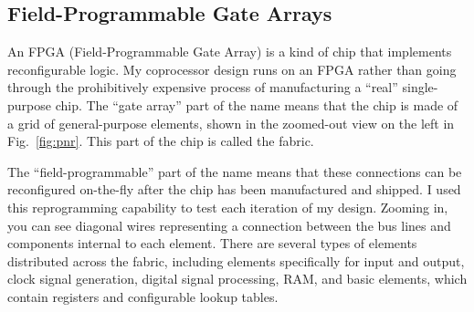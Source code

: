 \subsection{Field-Programmable Gate Arrays}
An FPGA (Field-Programmable Gate Array) is a kind of chip that implements reconfigurable logic. My coprocessor design runs on an FPGA rather than going through the prohibitively expensive process of manufacturing a ``real'' single-purpose chip. The ``gate array'' part of the name means that the chip is made of a grid of general-purpose elements, shown in the zoomed-out view on the left in Fig.~\ref{fig:pnr}. This part of the chip is called the fabric.

The ``field-programmable'' part of the name means that these connections can be reconfigured on-the-fly after the chip has been manufactured and shipped. I used this reprogramming capability to test each iteration of my design. Zooming in, you can see diagonal wires representing a connection between the bus lines and components internal to each element. There are several types of elements distributed across the fabric, including elements specifically for input and output, clock signal generation, digital signal processing, RAM, and basic elements, which contain registers and configurable lookup tables.

